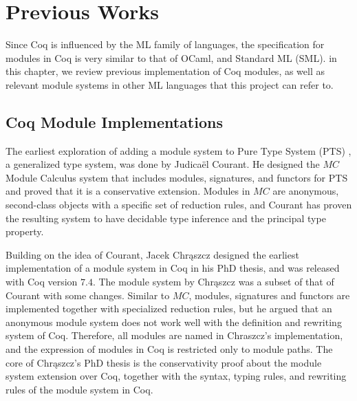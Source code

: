 \chapter{Previous Works}

Since Coq is influenced by the ML family of languages, the specification for
modules in Coq is very similar to that of OCaml, and Standard ML (SML). in this
chapter, we review previous implementation of Coq modules, as well as relevant
module systems in other ML languages that this project can refer to.



\section{Coq Module Implementations}
The earliest exploration of adding a module system to Pure Type System (PTS)
,
a generalized type system, was done by Judicaël Courant. He designed the $MC$
Module Calculus system that includes modules, signatures, and functors for PTS
and proved that it is a conservative extension.
 Modules in $MC$ are 
anonymous, second-class objects with a specific set of reduction rules, and
Courant has proven the resulting system to have decidable type inference and 
the principal type property.

Building on the idea of Courant, Jacek Chrąszcz designed the
earliest implementation of a module system in Coq in his PhD thesis, and was
released with Coq version $7.4$. The module system by Chrąszcz was a subset of
that of Courant with some changes. Similar to $MC$, modules, signatures and
functors are implemented together with specialized reduction rules,
but he argued that an anonymous module system does not work well with the
definition and rewriting system of Coq. Therefore, all modules are named in
Chraszcz's implementation, and the expression of modules
in Coq is restricted only to module paths. The core of Chrąszcz's PhD thesis is
the conservativity proof about the module system extension over Coq, together
with the syntax, typing rules, and rewriting rules of the module system in Coq.

